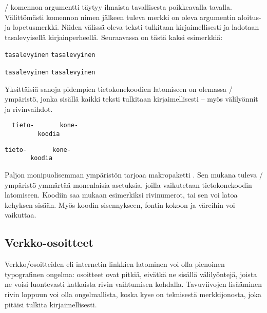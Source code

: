 \-/ komennon argumentti täytyy ilmaista tavallisesta
poikkeavalla tavalla. Välittömästi komennon nimen jälkeen tuleva merkki
on oleva argumentin aloitus- ja lopetusmerkki. Niiden välissä oleva
teksti tulkitaan kirjaimellisesti ja ladotaan tasalevyisellä
kirjainperheellä. Seuraavassa on tästä kaksi esimerkkiä:

\begin{koodilohkosis}
  \verb.tasalevyinen.   %
  \verb|tasalevyinen|   %
\end{koodilohkosis}

\begin{tulossis}
  \verb.tasalevyinen.
  \verb|tasalevyinen|
\end{tulossis}

Yksittäisiä sanoja pidempien tietokonekoodien latomiseen on olemassa
\-/ ympäristö, jonka sisällä kaikki teksti
tulkitaan kirjaimellisesti -- myös välilyönnit ja rivinvaihdot.

\begin{koodilohkosis}
  \begin{verbatim}
  tieto-       kone-
         koodia
  \end{verbatim}
\end{koodilohkosis}

\begin{tulossis}
\begin{verbatim}
tieto-       kone-
       koodia
\end{verbatim}
\end{tulossis}

Paljon monipuolisemman ympäristön tarjoaa makropaketti
. Sen mukana tuleva
\-/ ympäristö ymmärtää monenlaisia asetuksia,
joilla vaikutetaan tietokonekoodin latomiseen. Koodiin saa mukaan
esimerkiksi rivinumerot, tai sen voi latoa kehyksen sisään. Myös koodin
sisennykseen, fontin kokoon ja väreihin voi vaikuttaa.

\subsection{Verkko-osoitteet}

Verkko\-/osoitteiden eli internetin linkkien latominen voi olla
pienoinen typografinen ongelma: osoitteet ovat pitkiä, eivätkä ne
sisällä välilyöntejä, joista ne voisi luontevasti katkaista rivin
vaihtumisen kohdalla. Tavuviivojen lisääminen rivin loppuun voi olla
ongelmallista, koska kyse on teknisestä merkkijonosta, joka pitäisi
tulkita kirjaimellisesti.

